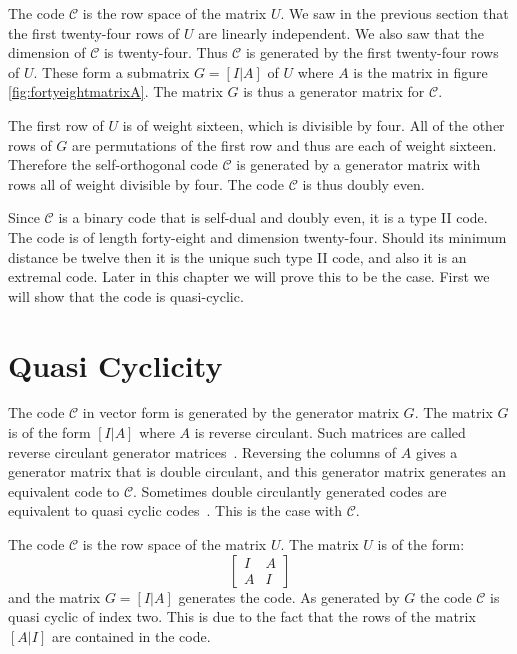 The code $\mathcal{C}$ is the row space of the matrix $U$.
We saw in the previous section that the first twenty-four rows of $U$ are linearly independent.
We also saw that the dimension of $\mathcal{C}$ is twenty-four.
Thus $\mathcal{C}$ is generated by the first twenty-four rows of $U$.
These form a submatrix $G = [I|A]$ of $U$ where $A$ is the matrix in figure \ref{fig:fortyeightmatrixA}.
The matrix $G$ is thus a generator matrix for $\mathcal{C}$.

The first row of $U$ is of weight sixteen, which is divisible by four.
All of the other rows of $G$ are permutations of the first row and thus are each of weight sixteen.
Therefore the self-orthogonal code $\mathcal{C}$ is generated by a generator matrix with rows all of weight divisible by four.
The code $\mathcal{C}$ is thus doubly even.

Since $\mathcal{C}$ is a binary code that is self-dual and doubly even, it is a type II code.
The code is of length forty-eight and dimension twenty-four.
Should its minimum distance be twelve then it is the unique such type II code, and also it is an extremal code.
Later in this chapter we will prove this to be the case.
First we will show that the code is quasi-cyclic.

\section{Quasi Cyclicity}
\label{sect:48quasicyclic}
The code $\mathcal{C}$ in vector form is generated by the generator matrix $G$.
The matrix $G$ is of the form $[I|A]$ where $A$ is reverse circulant.
Such matrices are called reverse circulant generator matrices~\cite[p.~377]{huf03}.
Reversing the columns of $A$ gives a generator matrix that is double circulant, and this generator matrix generates an equivalent code to $\mathcal{C}$.
Sometimes double circulantly generated codes are equivalent to quasi cyclic codes~\cite[p.~60]{han98a}.
This is the case with $\mathcal{C}$.

The code $\mathcal{C}$ is the row space of the matrix $U$.
The matrix $U$ is of the form:
\[ \left[ \begin{array}{c|c}
I & A \\
\hline
A & I
\end{array} \right] \]
and the matrix $G = [I|A]$ generates the code.
As generated by $G$ the code $\mathcal{C}$ is quasi cyclic of index two.
This is due to the fact that the rows of the matrix $[A|I]$ are contained in the code.

